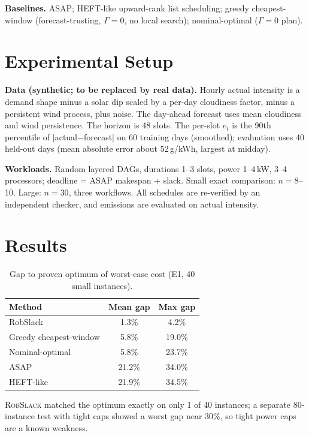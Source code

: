 \documentclass[conference,11pt]{IEEEtran}
\theoremstyle{definition}\newtheorem{remark}{Remark}
\newcommand{\Gm}{\Gamma}
\begin{document}
\textbf{Baselines.} ASAP; HEFT-like upward-rank list scheduling; greedy cheapest-window (forecast-trusting, $\Gm=0$, no local search); nominal-optimal ($\Gm=0$ plan).

\section{Experimental Setup}
\textbf{Data (synthetic; to be replaced by real data).} Hourly actual intensity is a demand shape minus a solar dip scaled by a per-day cloudiness factor, minus a persistent wind process, plus noise. The day-ahead forecast uses mean cloudiness and wind persistence. The horizon is 48 slots. The per-slot $e_t$ is the 90th percentile of $|$actual$-$forecast$|$ on 60 training days (smoothed); evaluation uses 40 held-out days (mean absolute error about 52\,g/kWh, largest at midday).

\textbf{Workloads.} Random layered DAGs, durations 1--3 slots, power 1--4\,kW, 3--4 processors; deadline = ASAP makespan + slack. Small exact comparison: $n=8$--10. Large: $n=30$, three workflows. All schedules are re-verified by an independent checker, and emissions are evaluated on actual intensity.

\section{Results}
\begin{table}[t]\centering\caption{Gap to proven optimum of worst-case cost (E1, 40 small instances).}
\begin{tabular}{lcc}\toprule Method & Mean gap & Max gap\\\midrule
RobSlack & 1.3\% & 4.2\%\\ Greedy cheapest-window & 5.8\% & 19.0\%\\ Nominal-optimal & 5.8\% & 23.7\%\\ ASAP & 21.2\% & 34.0\%\\ HEFT-like & 21.9\% & 34.5\%\\\bottomrule\end{tabular}\end{table}
\textsc{RobSlack} matched the optimum exactly on only 1 of 40 instances; a separate 80-instance test with tight caps showed a worst gap near 30\%, so tight power caps are a known weakness.
\end{document}
